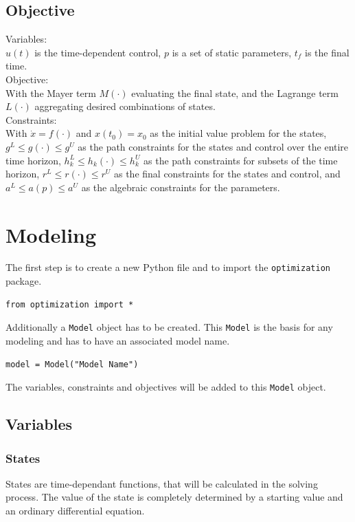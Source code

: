 \documentclass[12pt]{article}
\begin{document}
	\subsection{Objective}
	Variables:
	\\
	$u(t)$ is the time-dependent control, $p$ is a set of static parameters, $t_f$ is the final time.
	\\
	Objective:
	\\
	With the Mayer term $M(\cdot)$ evaluating the final state, and the Lagrange term $L(\cdot)$ aggregating desired combinations of states.
	\\
	Constraints:
	\\
	With $\dot{x} = f(\cdot)$ and $x(t_0) = x_0$ as the initial value problem for the states, $g^L \leq g(\cdot) \leq g^U$ as the path constraints for the states and control over the entire time horizon, $h^L_k \leq h_k(\cdot) \leq h^U_k$ as the path constraints for subsets of the time horizon, $r^L \leq r(\cdot) \leq r^U$ as the final constraints for the states and control, and $a^L \leq a(p) \leq a^U$ as the algebraic constraints for the parameters.
	
	\section{Modeling}
	
	The first step is to create a new Python file and to import the \texttt{optimization} package.
	\begin{lstlisting}
from optimization import *
	\end{lstlisting}

	Additionally a \texttt{Model} object has to be created. This \texttt{Model} is the basis for any modeling and has to have an associated model name.
	\begin{lstlisting}
model = Model("Model Name")
	\end{lstlisting}

	The variables, constraints and objectives will be added to this \texttt{Model} object.

	\subsection{Variables} 
	
	\subsubsection{States}
	
	States are time-dependant functions, that will be calculated in the solving process. The value of the state is completely determined by a starting value and an ordinary differential equation.
	
\end{document}
